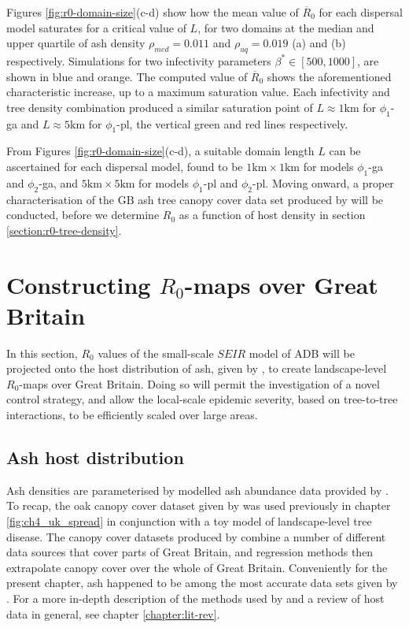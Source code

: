 Figures \ref{fig:r0-domain-size}(c-d) show how the mean value of $\overline{R}_0$ for each dispersal model saturates for a critical value of $L$, 
for two domains at the median and upper quartile of ash density $\rho_{med}=0.011$ and $\rho_{uq}=0.019$ (a) and (b) respectively.
Simulations for two infectivity parameters $\beta^* \in [500, 1000]$, are shown in blue and orange.
The computed value of $\overline{R}_0$ shows the aforementioned characteristic increase, up to a maximum saturation value.
Each infectivity and tree density combination produced a similar saturation point of $L \approx 1\mathrm{km}$ for $\phi_1$-ga and $L\approx 5\mathrm{km}$ for $\phi_1$-pl, the vertical green and red lines respectively. 

From Figures \ref{fig:r0-domain-size}(c-d), a suitable domain length $L$ can be ascertained for each dispersal model, 
found to be $\mathrm{1km\times1km}$ for models $\phi_1$-ga and $\phi_2$-ga, and $\mathrm{5km\times5km}$ for models $\phi_1$-pl and $\phi_2$-pl. 
Moving onward, a proper characterisation of the GB ash tree canopy cover data set produced by \cite{hill.data} will be conducted,
before we determine $R_0$ as a function of host density in section \ref{section:r0-tree-density}.

\section{Constructing $R_0$-maps over Great Britain}

\label{sec:r0-map-construct}
In this section, $R_0$ values of the small-scale $SEIR$ model of ADB will be projected onto the host distribution of ash, given by \cite{hill.data}, to create landscape-level $R_0$-maps over Great Britain. 
Doing so will permit the investigation of a novel control strategy, and allow the local-scale epidemic severity, based on tree-to-tree interactions, to be efficiently scaled over large areas.

\subsection{Ash host distribution}

Ash densities are parameterised by modelled ash abundance data provided by \cite{hill.data}. 
To recap, the oak canopy cover dataset given by \cite{hill.data} was used previously in chapter \ref{fig:ch4_uk_spread} in conjunction with a toy model of landscape-level tree disease.
The canopy cover datasets produced by \cite{hill.data} combine a number of different data sources that cover parts of Great Britain, 
and regression methods then extrapolate canopy cover over the whole of Great Britain.
Conveniently for the present chapter, ash happened to be among the most accurate data sets given by \cite{hill.data}. 
For a more in-depth description of the methods used by \cite{hill.data} and a review of host data in general, see chapter \ref{chapter:lit-rev}.

